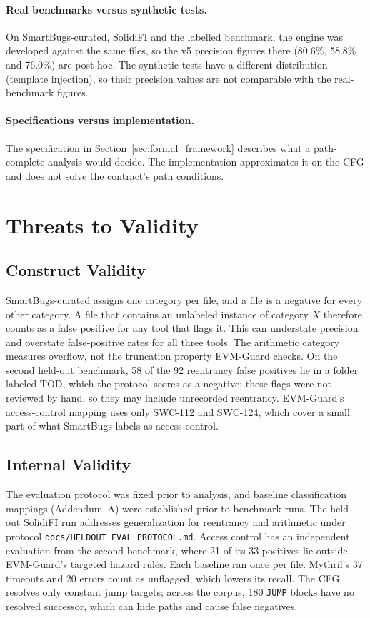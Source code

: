 \documentclass[pdflatex,sn-mathphys]{sn-jnl}
\theoremstyle{thmstyleone}
\theoremstyle{thmstyletwo}
\begin{document}
\paragraph{Real benchmarks versus synthetic tests.} On SmartBugs-curated, SolidiFI and the labelled benchmark, the engine was developed against the same files, so the v5 precision figures there (80.6\%, 58.8\% and 76.0\%) are post hoc. The synthetic tests have a different distribution (template injection), so their precision values are not comparable with the real-benchmark figures.

\paragraph{Specifications versus implementation.} The specification in Section~\ref{sec:formal_framework} describes what a path-complete analysis would decide. The implementation approximates it on the CFG and does not solve the contract's path conditions.

\section{Threats to Validity}\label{sec:threats}

\subsection{Construct Validity}\label{sec:threats:construct}
SmartBugs-curated assigns one category per file, and a file is a negative for every other category. A file that contains an unlabeled instance of category $X$ therefore counts as a false positive for any tool that flags it. This can understate precision and overstate false-positive rates for all three tools. The arithmetic category measures overflow, not the truncation property EVM-Guard checks. On the second held-out benchmark, 58 of the 92 reentrancy false positives lie in a folder labeled TOD, which the protocol scores as a negative; these flags were not reviewed by hand, so they may include unrecorded reentrancy. EVM-Guard's access-control mapping uses only SWC-112 and SWC-124, which cover a small part of what SmartBugs labels as access control.

\subsection{Internal Validity}\label{sec:threats:internal}
The evaluation protocol was fixed prior to analysis, and baseline classification mappings (Addendum~A) were established prior to benchmark runs. The held-out SolidiFI run addresses generalization for reentrancy and arithmetic under protocol \texttt{docs/HELDOUT\_EVAL\_PROTOCOL.md}. Access control has an independent evaluation from the second benchmark, where 21 of its 33 positives lie outside EVM-Guard's targeted hazard rules. Each baseline ran once per file. Mythril's 37 timeouts and 20 errors count as unflagged, which lowers its recall. The CFG resolves only constant jump targets; across the corpus, 180 \texttt{JUMP} blocks have no resolved successor, which can hide paths and cause false negatives.
\end{document}
